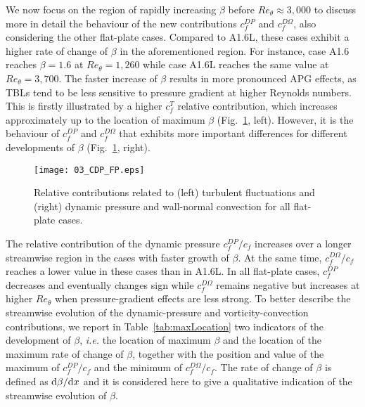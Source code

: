 We now focus on the region of rapidly increasing $\beta$ before $Re_\theta\approx3,000$ to discuss more in detail the behaviour of the new contributions $c^{DP}_f$ and $c^{D\Omega}_f$, also considering the other flat-plate cases. Compared to A1.6L, these cases exhibit a higher rate of change of $\beta$ in the aforementioned region. For instance, case A1.6 reaches $\beta=1.6$ at $Re_\theta=1,260$ while case A1.6L reaches the same value at $Re_\theta=3,700$. The faster increase of $\beta$ results in more pronounced APG effects, as TBLs tend to be less sensitive to pressure gradient at higher Reynolds numbers. This is firstly illustrated by a higher $c^T_f$ relative contribution, which increases approximately up to the location of maximum $\beta$ (Fig.~\ref{fig:contributionsAPG}, left). However, it is the behaviour of $c^{DP}_f$ and $c^{D\Omega}_f$ that exhibits more important differences for different developments of $\beta$ (Fig.~\ref{fig:contributionsAPG}, right).
\begin{figure}
\centering
\texttt{[image: 03\_CDP\_FP.eps]}%
\caption{\label{fig:contributionsAPG} Relative contributions related to (left) turbulent fluctuations and (right) dynamic pressure and wall-normal convection for all flat-plate cases.}
\end{figure} 
The relative contribution of the dynamic pressure $c^{DP}_f/c_f$ increases over a longer streamwise region in the cases with faster growth of $\beta$. At the same time, $c^{D\Omega}_f/c_f$ reaches a lower value in these cases than in A1.6L. In all flat-plate cases, $c^{DP}_f$ decreases and eventually changes sign while $c^{D\Omega}_f$ remains negative but increases at higher $Re_\theta$ when pressure-gradient effects are less strong. To better describe the streamwise evolution of the dynamic-pressure and vorticity-convection contributions, we report in Table~\ref{tab:maxLocation} two indicators of the development of $\beta$, \textit{i.e.\!} the location of maximum $\beta$ and the location of the maximum rate of change of $\beta$, together with the position and value of the maximum of $c^{DP}_f/c_f$ and the minimum of $c^{D\Omega}_f/c_f$. The rate of change of $\beta$ is defined as ${\rm d} \beta / {\rm d} x$ and it is considered here to give a qualitative indication of the streamwise evolution of $\beta$.


